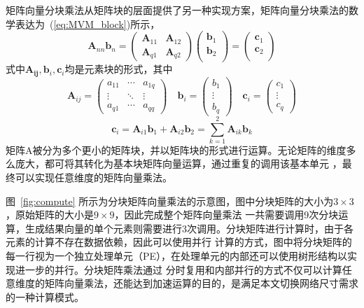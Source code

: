 矩阵向量分块乘法从矩阵块的层面提供了另一种实现方案，矩阵向量分块乘法的数学表达为~(\ref{eq:MVM_block})所示，
\begin{equation}
	\mathbf{A}_{nn} \mathbf{b}_n = 
	\begin{pmatrix}
		\mathbf{A}_{11} & \mathbf{A}_{12}  \\
  		\mathbf{A}_{q1} & \mathbf{A}_{q2} 
 \end{pmatrix}
	\begin{pmatrix}
        \mathbf{b}_{1}	\\ 
        \mathbf{b}_{2}	\\
	\end{pmatrix}
  =
	\begin{pmatrix}
        \mathbf{c}_{1}	\\ 
        \mathbf{c}_{2}	\\
     \end{pmatrix}
\label{eq:MVM_block}
\end{equation}
式中\(\mathbf{A_{ij}},\mathbf{b}_i,\mathbf{c}_i\)均是元素块的形式，其中
\begin{equation}
	\mathbf{A}_{ij} = 
		\begin{pmatrix}
		a_{11} & \cdots & a_{1q} \\
  		\vdots  & \ddots & \vdots  \\
  		a_{q1} & \cdots & a_{qq}
		\end{pmatrix}
	\quad
	\mathbf{b}_i = 
		\begin{pmatrix}
        b_{1}	\\
		\vdots	\\	
        b_{q}	
	\end{pmatrix}
	\quad
	\mathbf{c}_i = 
		\begin{pmatrix}
        c_{1}	\\
		\vdots	\\	
        c_{q}	
	\end{pmatrix}
\end{equation}
$$	\mathbf{c}_{i}= \mathbf{A}_{i1} \mathbf{b}_{1} + \mathbf{A}_{i2} \mathbf{b}_{2} = \sum_{k=1}^2 \mathbf{A}_{ik}\mathbf{b}_{k}	$$
矩阵A被分为多个更小的矩阵块，并以矩阵块的形式进行运算。无论矩阵的维度多么庞大，都可将其转化为基本块矩阵向量运算，通过重复的调用该基本单元
，最终可以实现任意维度的矩阵向量乘法。

图~\ref{fig:compute} 所示为分块矩阵向量乘法的示意图，图中分块矩阵的大小为\(3 \times 3\)，原始矩阵的大小是\(9 \times 9\)，因此完成整个矩阵向量乘法
一共需要调用9次分块运算，生成结果向量的单个元素则需要进行3次调用。分块矩阵进行计算时，由于各元素的计算不存在数据依赖，因此可以使用并行
计算的方式，图中将分块矩阵的每一行视为一个独立处理单元（PE），在处理单元的内部还可以使用树形结构以实现进一步的并行。分块矩阵乘法通过
分时复用和内部并行的方式不仅可以计算任意维度的矩阵向量乘法，还能达到加速运算的目的，是满足本文切换网络尺寸需求的一种计算模式。

